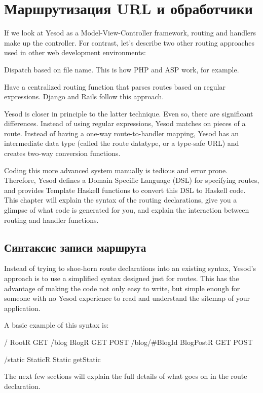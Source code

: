 \chapter{Маршрутизация URL и обработчики}

If we look at Yesod as a Model-View-Controller framework, routing and
handlers make up the controller. For contrast, let's describe two
other routing approaches used in other web development environments:

Dispatch based on file name. This is how PHP and ASP work, for example.

Have a centralized routing function that parses routes based on
regular expressions. Django and Rails follow this approach.

Yesod is closer in principle to the latter technique. Even so, there
are significant differences. Instead of using regular expressions,
Yesod matches on pieces of a route. Instead of having a one-way
route-to-handler mapping, Yesod has an intermediate data type (called
the route datatype, or a type-safe URL) and creates two-way conversion
functions.

Coding this more advanced system manually is tedious and error
prone. Therefore, Yesod defines a Domain Specific Language (DSL) for
specifying routes, and provides Template Haskell functions to convert
this DSL to Haskell code. This chapter will explain the syntax of the
routing declarations, give you a glimpse of what code is generated for
you, and explain the interaction between routing and handler
functions.

\section{Синтаксис записи маршрута}

Instead of trying to shoe-horn route declarations into an existing
syntax, Yesod's approach is to use a simplified syntax designed just
for routes. This has the advantage of making the code not only easy to
write, but simple enough for someone with no Yesod experience to read
and understand the sitemap of your application.

A basic example of this syntax is:

/             RootR     GET
/blog         BlogR     GET POST
/blog/#BlogId BlogPostR GET POST

/static       StaticR   Static getStatic

The next few sections will explain the full details of what goes on in
the route declaration.

